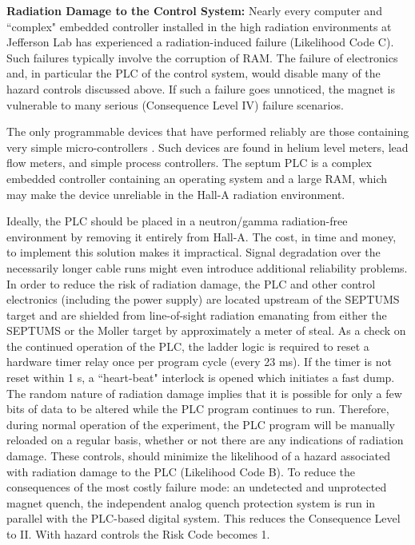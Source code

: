 {\bf Radiation Damage to the Control System:}
Nearly every computer and ``complex" embedded controller installed in the high radiation environments at 
Jefferson Lab has experienced a radiation-induced failure (Likelihood Code C).  Such failures typically 
involve the corruption of RAM. The failure of electronics and, in particular the PLC of the control system, 
would disable many of the hazard controls discussed above.  If such a failure goes unnoticed, the magnet is 
vulnerable to many serious (Consequence Level IV) failure scenarios.

The only programmable devices that have performed reliably are those containing very simple micro-controllers .  
Such devices are found in helium level meters, lead flow meters, and simple process controllers.  The septum 
PLC is a complex embedded controller containing an operating system and a large RAM, which may make the device 
unreliable in the Hall-A radiation environment.

Ideally, the PLC should be placed in a neutron/gamma radiation-free environment by removing it entirely 
from Hall-A.  The cost, in time and money, to implement this solution makes it impractical.  Signal 
degradation over the necessarily longer cable runs might even introduce additional reliability problems.  
In order to reduce the risk of radiation damage, the PLC and other control electronics (including 
the power supply) are located upstream of the SEPTUMS target and are shielded from line-of-sight radiation 
emanating from either the SEPTUMS or the Moller target by approximately a meter of steal.  As a check on 
the continued operation of the PLC, the ladder logic is required to reset a hardware timer relay once per 
program cycle (every 23 ms).  If the timer is not reset within 1 s, a ``heart-beat" interlock is opened which 
initiates a fast dump.  The random nature of radiation damage implies that it is possible for only a few bits 
of data to be altered while the PLC program continues to run.  Therefore, during normal operation of the 
experiment, the PLC program will be manually reloaded on a regular basis, whether or not there are any 
indications of radiation damage.  These controls, should minimize the likelihood of a hazard associated 
with radiation damage to the PLC (Likelihood Code B).  To reduce the consequences of the most costly 
failure mode: an undetected and unprotected magnet quench, the independent analog quench protection system 
is run in parallel with the PLC-based digital system.  This reduces the Consequence Level to II. With 
hazard controls the Risk Code becomes 1.

